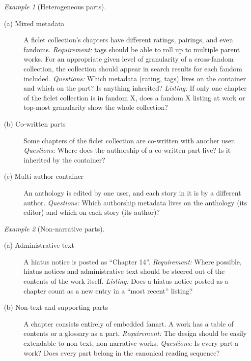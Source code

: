 \documentclass{amsart}
\theoremstyle{remark}
\newtheorem{eg}{Example}
\begin{document}
    \begin{eg}[Heterogeneous parts]\label{eg:heterogeneous}
        \begin{description}
          \item[(a) Mixed metadata] A ficlet collection's chapters have different ratings, pairings, and even fandoms.
          \emph{Requirement:} tags should be able to roll up to multiple parent works. For an appropriate given level of granularity of a cross-fandom collection, the collection should appear in search results for each fandom included.
          \emph{Questions:} Which metadata (rating, tags) lives on the container and which on the part? Is anything inherited?
          \emph{Listing:} If only one chapter of the ficlet collection is in fandom X, does a fandom X listing at work or top-most granularity show the whole collection?
          \item[(b) Co-written parts] Some chapters of the ficlet collection are co-written with another user.
          \emph{Questions:} Where does the authorship of a co-written part live? Is it inherited by the container?
          \item[(c) Multi-author container] An anthology is edited by one user, and each story in it is by a different author.
          \emph{Questions:} Which authorship metadata lives on the anthology (its editor) and which on each story (its author)?
        \end{description}
    \end{eg}
    \begin{eg}[Non-narrative parts]\label{eg:non-narrative}
        \begin{description}
          \item[(a) Administrative text] A hiatus notice is posted as ``Chapter 14''.
          \emph{Requirement:} Where possible, hiatus notices and administrative text should be steered out of the contents of the work itself.
          \emph{Listing:} Does a hiatus notice posted as a chapter count as a new entry in a ``most recent'' listing?
          \item[(b) Non-text and supporting parts] A chapter consists entirely of embedded fanart. A work has a table of contents or a glossary as a part.
          \emph{Requirement:} The design should be easily extendable to non-text, non-narrative works.
          \emph{Questions:} Is every part a work? Does every part belong in the canonical reading sequence?
        \end{description}
    \end{eg}
\end{document}
